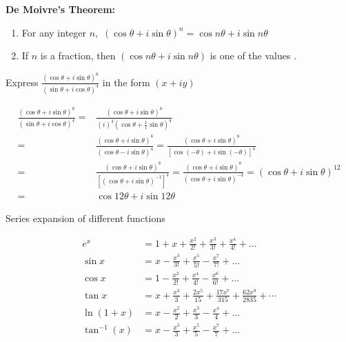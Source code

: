 \begin{theorem}
	\textbf{De Moivre's Theorem:}
	\begin{enumerate}
		\item For any integer $n,$ $(\cos \theta+i \sin \theta)^{n}=\cos n \theta+i \sin n \theta$
		\item 	If $n$ is a fraction, then $(\cos n \theta+i \sin n \theta)$ is one of the values .
	\end{enumerate}
\end{theorem}
\begin{exercise}
  Express $\frac{(\cos \theta+i \sin \theta)^{8}}{(\sin \theta+i \cos \theta)^{4}}$ in the form $(x+i y)$
\end{exercise}
\begin{answer}
	$$
	\begin{aligned}
	\frac{(\cos \theta+i \sin \theta)^{8}}{(\sin \theta+i \cos \theta)^{4}}=&\frac{(\cos \theta+i \sin \theta)^{8}}{(i)^{4}\left(\cos \theta+\frac{1}{i} \sin \theta\right)^{4}} \\
	=& \frac{(\cos \theta+i \sin \theta)^{8}}{(\cos \theta-i \sin \theta)^{4}}=\frac{(\cos \theta+i \sin \theta)^{8}}{[\cos (-\theta)+i \sin (-\theta)]^{4}} \\
	=& \frac{(\cos \theta+i \sin \theta)^{8}}{\left[(\cos \theta+i \sin \theta)^{-1}\right]^{4}}=\frac{(\cos \theta+i \sin \theta)^{8}}{(\cos \theta+i \sin \theta)^{-4}}=(\cos \theta+i \sin \theta)^{12} \\
	=& \cos 12 \theta+i \sin 12 \theta
	\end{aligned}
	$$
\end{answer}
\begin{note}
	Series expansion of different functions
	
	\begin{align*}
	e^{x}&=1+x+\frac{x^{2}}{2 !}+\frac{x^{3}}{3 !}+\frac{x^{4}}{4 !}+\ldots \\
	\sin x&=x-\frac{x^{3}}{3 !}+\frac{x^{5}}{5 !}-\frac{x^{7}}{7 !}+\ldots \\
	\cos x&=1-\frac{x^{2}}{2 !}+\frac{x^{4}}{4 !}-\frac{x^{6}}{6 !}+\ldots \\
	\tan x&=x+\frac{x^{3}}{3}+\frac{2 x^{5}}{15}+\frac{17 x^{7}}{315}+\frac{62 x^{9}}{2835} +\cdots\\
	\ln (1+x)&=x-\frac{x^{2}}{2}+\frac{x^{3}}{3}-\frac{x^{4}}{4}+\ldots \\
    \tan ^{-1}(x)&=x-\frac{x^{3}}{3}+\frac{x^{5}}{5}-\frac{x^{7}}{7}+\ldots
	\end{align*}
	
\end{note}
